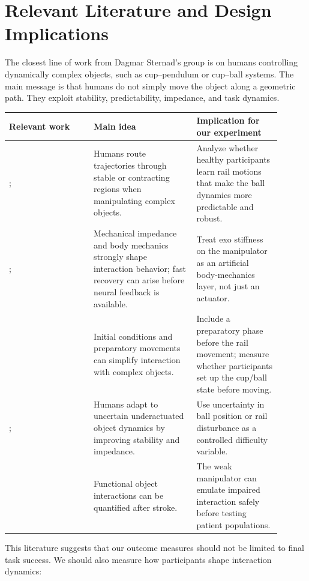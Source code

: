 \documentclass[11pt, a4paper]{article}
\begin{document}
\section{Relevant Literature and Design Implications}

The closest line of work from Dagmar Sternad's group is on humans controlling dynamically complex objects, such as cup--pendulum or cup--ball systems. The main message is that humans do not simply move the object along a geometric path. They exploit stability, predictability, impedance, and task dynamics.

\begin{center}
{\small
\begin{tabular}{p{0.28\linewidth}p{0.34\linewidth}p{0.28\linewidth}}
\toprule
\textbf{Relevant work} & \textbf{Main idea} & \textbf{Implication for our experiment} \\
\midrule
\citet{bazzi2020}; \citet{bazzi2018} & Humans route trajectories through stable or contracting regions when manipulating complex objects. & Analyze whether healthy participants learn rail motions that make the ball dynamics more predictable and robust. \\
\citet{razavian2021}; \citet{razavian2023} & Mechanical impedance and body mechanics strongly shape interaction behavior; fast recovery can arise before neural feedback is available. & Treat exo stiffness on the manipulator as an artificial body-mechanics layer, not just an actuator. \\
\citet{nayeem2021} & Initial conditions and preparatory movements can simplify interaction with complex objects. & Include a preparatory phase before the rail movement; measure whether participants set up the cup/ball state before moving. \\
\citet{lokesh2024}; \citet{lokesh2025} & Humans adapt to uncertain underactuated object dynamics by improving stability and impedance. & Use uncertainty in ball position or rail disturbance as a controlled difficulty variable. \\
\citet{nayeem2022} & Functional object interactions can be quantified after stroke. & The weak manipulator can emulate impaired interaction safely before testing patient populations. \\
\bottomrule
\end{tabular}}
\end{center}

This literature suggests that our outcome measures should not be limited to final task success. We should also measure how participants shape interaction dynamics:
\end{document}
